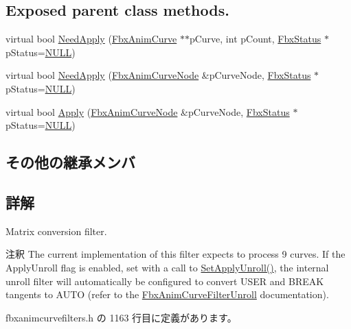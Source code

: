 \subsection*{Exposed parent class methods.}
\begin{DoxyCompactItemize}
\item 
virtual bool \hyperlink{class_fbx_anim_curve_filter_matrix_converter_a7cae8d7e31ab1cf2437de8636a5b4916}{Need\+Apply} (\hyperlink{class_fbx_anim_curve}{Fbx\+Anim\+Curve} $\ast$$\ast$p\+Curve, int p\+Count, \hyperlink{class_fbx_status}{Fbx\+Status} $\ast$p\+Status=\hyperlink{fbxarch_8h_a070d2ce7b6bb7e5c05602aa8c308d0c4}{N\+U\+LL})
\item 
virtual bool \hyperlink{class_fbx_anim_curve_filter_matrix_converter_a00f04a303254479eef1aa3bfbe0643d8}{Need\+Apply} (\hyperlink{class_fbx_anim_curve_node}{Fbx\+Anim\+Curve\+Node} \&p\+Curve\+Node, \hyperlink{class_fbx_status}{Fbx\+Status} $\ast$p\+Status=\hyperlink{fbxarch_8h_a070d2ce7b6bb7e5c05602aa8c308d0c4}{N\+U\+LL})
\item 
virtual bool \hyperlink{class_fbx_anim_curve_filter_matrix_converter_aa71462534eff53b1177aaa5bb3e059ec}{Apply} (\hyperlink{class_fbx_anim_curve_node}{Fbx\+Anim\+Curve\+Node} \&p\+Curve\+Node, \hyperlink{class_fbx_status}{Fbx\+Status} $\ast$p\+Status=\hyperlink{fbxarch_8h_a070d2ce7b6bb7e5c05602aa8c308d0c4}{N\+U\+LL})
\end{DoxyCompactItemize}
\subsection*{その他の継承メンバ}


\subsection{詳解}
Matrix conversion filter.

\begin{DoxyRemark}{注釈}
The current implementation of this filter expects to process 9 curves. If the Apply\+Unroll flag is enabled, set with a call to \hyperlink{class_fbx_anim_curve_filter_matrix_converter_abcfe379526feec5a8d3ffc9e3e435d66}{Set\+Apply\+Unroll()}, the internal unroll filter will automatically be configured to convert U\+S\+ER and B\+R\+E\+AK tangents to A\+U\+TO (refer to the \hyperlink{class_fbx_anim_curve_filter_unroll}{Fbx\+Anim\+Curve\+Filter\+Unroll} documentation). 
\end{DoxyRemark}


 fbxanimcurvefilters.\+h の 1163 行目に定義があります。



